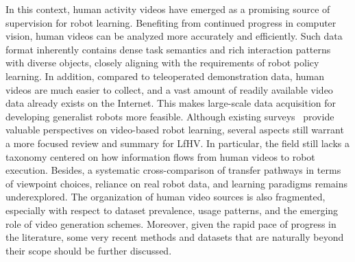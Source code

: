 \documentclass[Afour,sageh,times]{sagej}
\begin{document}
In this context, human activity videos have emerged as a promising source of supervision for robot learning. Benefiting from continued progress in computer vision, human videos can be analyzed more accurately and efficiently. Such data format inherently contains dense task semantics and rich interaction patterns with diverse objects, closely aligning with the requirements of robot policy learning. In addition, compared to teleoperated demonstration data, human videos are much easier to collect, and a vast amount of readily available video data already exists on the Internet. This makes large-scale data acquisition for developing generalist robots more feasible. Although existing surveys~\citep{mccarthy2025towards,eze2025learning,feng2026human,zheng2026video} provide valuable perspectives on video-based robot learning, several aspects still warrant a more focused review and summary for LfHV. In particular, the field still lacks a taxonomy centered on how information flows from human videos to robot execution. Besides, a systematic cross-comparison of transfer pathways in terms of viewpoint choices, reliance on real robot data, and learning paradigms remains underexplored. The organization of human video sources is also fragmented, especially with respect to dataset prevalence, usage patterns, and the emerging role of video generation schemes. Moreover, given the rapid pace of progress in the literature, some very recent methods and datasets that are naturally beyond their scope should be further discussed.
\end{document}
